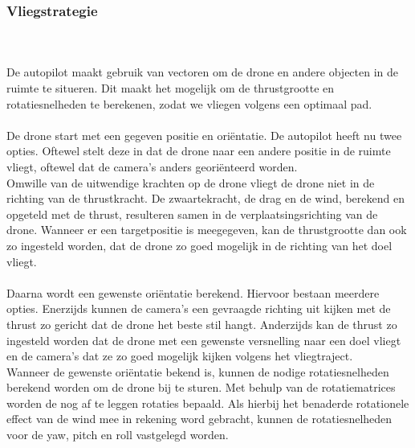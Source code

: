 \subsubsection{Vliegstrategie}
\\
\\
De autopilot maakt gebruik van vectoren om de drone en andere objecten in de ruimte te situeren. Dit maakt het mogelijk om de thrustgrootte en rotatiesnelheden te berekenen, zodat we vliegen volgens een optimaal pad.
\\
\\
De drone start met een gegeven positie en ori\"entatie. De autopilot heeft nu twee opties. Oftewel stelt deze in dat de drone naar een andere positie in de ruimte vliegt, oftewel dat de camera's anders geori\"enteerd worden.
\\
Omwille van de uitwendige krachten op de drone vliegt de drone niet in de richting van de thrustkracht. De zwaartekracht, de drag en de wind, berekend en opgeteld met de thrust, resulteren samen in de verplaatsingsrichting van de drone. Wanneer er een targetpositie is meegegeven, kan de thrustgrootte dan ook zo ingesteld worden, dat de drone zo goed mogelijk in de richting van het doel vliegt.
\\
\\
Daarna wordt een gewenste ori\"entatie berekend. Hiervoor bestaan meerdere opties. Enerzijds kunnen de camera's een gevraagde richting uit kijken met de thrust zo gericht dat de drone het beste stil hangt. Anderzijds kan de thrust zo ingesteld worden dat de drone met een gewenste versnelling naar een doel vliegt en de camera's dat ze zo goed mogelijk kijken volgens het vliegtraject.
\\
Wanneer de gewenste ori\"entatie bekend is, kunnen de nodige rotatiesnelheden berekend worden om de drone bij te sturen. Met behulp van de rotatiematrices worden de nog af te leggen rotaties bepaald. Als hierbij het benaderde rotationele effect van de wind mee in rekening word gebracht, kunnen de rotatiesnelheden voor de yaw, pitch en roll vastgelegd worden.